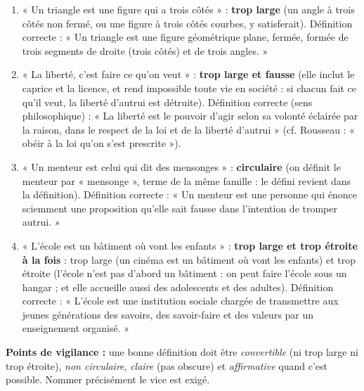 \documentclass[11pt]{article}
\begin{document}
\begin{corrige}
\begin{enumerate}
    \item « Un triangle est une figure qui a trois côtés » : \textbf{trop large} (un angle à trois côtés non fermé, ou une figure à trois côtés courbes, y satisferait). Définition correcte : « Un triangle est une figure géométrique plane, fermée, formée de trois segments de droite (trois côtés) et de trois angles. »
    \item « La liberté, c'est faire ce qu'on veut » : \textbf{trop large et fausse} (elle inclut le caprice et la licence, et rend impossible toute vie en société : si chacun fait ce qu'il veut, la liberté d'autrui est détruite). Définition correcte (sens philosophique) : « La liberté est le pouvoir d'agir selon sa volonté éclairée par la raison, dans le respect de la loi et de la liberté d'autrui » (cf. Rousseau : « obéir à la loi qu'on s'est prescrite »).
    \item « Un menteur est celui qui dit des mensonges » : \textbf{circulaire} (on définit le menteur par « mensonge », terme de la même famille : le défini revient dans la définition). Définition correcte : « Un menteur est une personne qui énonce sciemment une proposition qu'elle sait fausse dans l'intention de tromper autrui. »
    \item « L'école est un bâtiment où vont les enfants » : \textbf{trop large et trop étroite à la fois} : trop large (un cinéma est un bâtiment où vont les enfants) et trop étroite (l'école n'est pas d'abord un bâtiment : on peut faire l'école sous un hangar ; et elle accueille aussi des adolescents et des adultes). Définition correcte : « L'école est une institution sociale chargée de transmettre aux jeunes générations des savoirs, des savoir-faire et des valeurs par un enseignement organisé. »
\end{enumerate}
\textbf{Points de vigilance :} une bonne définition doit être \emph{convertible} (ni trop large ni trop étroite), \emph{non circulaire}, \emph{claire} (pas obscure) et \emph{affirmative} quand c'est possible. Nommer précisément le vice est exigé.
\end{corrige}
\end{document}
